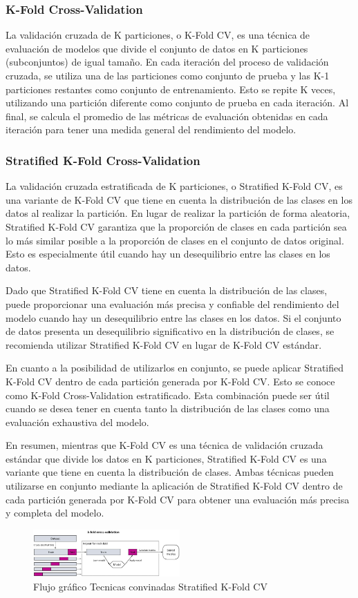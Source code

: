 \subsubsection{K-Fold Cross-Validation}
La validación cruzada de K particiones, o K-Fold CV, es una técnica de evaluación de modelos que divide el conjunto de datos en K particiones (subconjuntos) de igual tamaño. En cada iteración del proceso de validación cruzada, se utiliza una de las particiones como conjunto de prueba y las K-1 particiones restantes como conjunto de entrenamiento. Esto se repite K veces, utilizando una partición diferente como conjunto de prueba en cada iteración. Al final, se calcula el promedio de las métricas de evaluación obtenidas en cada iteración para tener una medida general del rendimiento del modelo.

\subsubsection{Stratified K-Fold Cross-Validation}
La validación cruzada estratificada de K particiones, o Stratified K-Fold CV, es una variante de K-Fold CV que tiene en cuenta la distribución de las clases en los datos al realizar la partición. En lugar de realizar la partición de forma aleatoria, Stratified K-Fold CV garantiza que la proporción de clases en cada partición sea lo más similar posible a la proporción de clases en el conjunto de datos original. Esto es especialmente útil cuando hay un desequilibrio entre las clases en los datos.

Dado que Stratified K-Fold CV tiene en cuenta la distribución de las clases, puede proporcionar una evaluación más precisa y confiable del rendimiento del modelo cuando hay un desequilibrio entre las clases en los datos. Si el conjunto de datos presenta un desequilibrio significativo en la distribución de clases, se recomienda utilizar Stratified K-Fold CV en lugar de K-Fold CV estándar.

En cuanto a la posibilidad de utilizarlos en conjunto, se puede aplicar Stratified K-Fold CV dentro de cada partición generada por K-Fold CV. Esto se conoce como K-Fold Cross-Validation estratificado. Esta combinación puede ser útil cuando se desea tener en cuenta tanto la distribución de las clases como una evaluación exhaustiva del modelo.

En resumen, mientras que K-Fold CV es una técnica de validación cruzada estándar que divide los datos en K particiones, Stratified K-Fold CV es una variante que tiene en cuenta la distribución de clases. Ambas técnicas pueden utilizarse en conjunto mediante la aplicación de Stratified K-Fold CV dentro de cada partición generada por K-Fold CV para obtener una evaluación más precisa y completa del modelo. \cite{dankers2018prediction}

\begin{figure}[H]
  \centering
  \includegraphics[width=0.5\textwidth]{img/analisis de metodologia/463627_1_En_8_Fig8_HTML.jpg}
  \caption{Flujo gráfico Tecnicas convinadas Stratified K-Fold CV}
  \label{fig:flujo_kfoldcvstratfield}
\end{figure}
